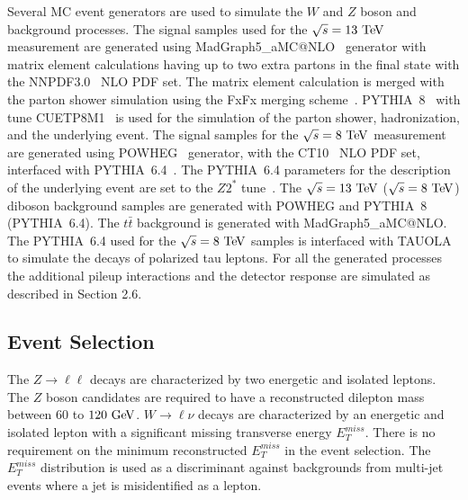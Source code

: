 Several MC event generators are used to simulate the $W$ and $Z$ boson and background processes. The signal samples used for the $\sqrt{s}=13~\mathrm{Te\kern -0.1em V}$ measurement are generated using MadGraph5\_aMC@NLO~\cite{Alwall:2007st} generator with matrix element calculations having up to two extra partons in the final state with the NNPDF3.0~\cite{Ball:2014uwa} NLO PDF set. The matrix element calculation is merged with the parton shower simulation using the FxFx merging scheme~\cite{Frederix:2012ps}. PYTHIA~8~\cite{Sjostrand:2006za,Sjostrand:2014zea}  with tune CUETP8M1~\cite{Skands:2014pea} is used for the simulation of the parton shower, hadronization, and the underlying event.  The signal samples for the $\sqrt{s}=8~\mathrm{Te\kern -0.1em V}$ measurement are generated using POWHEG~\cite{POWHEG-V, POWHEG1, POWHEG2, POWHEG3} generator, with the CT10~\cite{Lai:2010vv} NLO PDF set, interfaced with PYTHIA~6.4~\cite{Sjostrand:2006za}. The PYTHIA~6.4 parameters for the description of the underlying event are set to the $Z2^{*}$ tune~\cite{CMS-PAS-FSQ-12-020}. The  $\sqrt{s}=13~\mathrm{Te\kern -0.1em V}$ ($\sqrt{s}=8~\mathrm{Te\kern -0.1em V}$) diboson background samples are generated with POWHEG and PYTHIA~8 (PYTHIA~6.4). The $t\bar{t}$ background is generated with MadGraph5\_aMC@NLO. The PYTHIA~6.4 used for the  $\sqrt{s}=8~\mathrm{Te\kern -0.1em V}$ samples is interfaced with TAUOLA to simulate the decays of polarized tau leptons. For all the generated processes the additional pileup interactions and the detector response are simulated as described in Section 2.6.

\subsection{Event Selection}

The $Z \rightarrow \ell\ell$ decays are characterized by two energetic and isolated leptons. The $Z$ boson candidates are required to have a reconstructed dilepton mass between $60$ to $120~\mathrm{Ge\kern -0.1em V}$. $W \rightarrow \ell \nu$ decays are characterized by an energetic and isolated lepton with a significant missing transverse energy $E_{T}^{miss}$. There is no requirement on the minimum reconstructed $E_{T}^{miss}$ in the event selection. The $E_{T}^{miss}$ distribution is used as a discriminant against backgrounds from multi-jet events where a jet is misidentified as a lepton.

